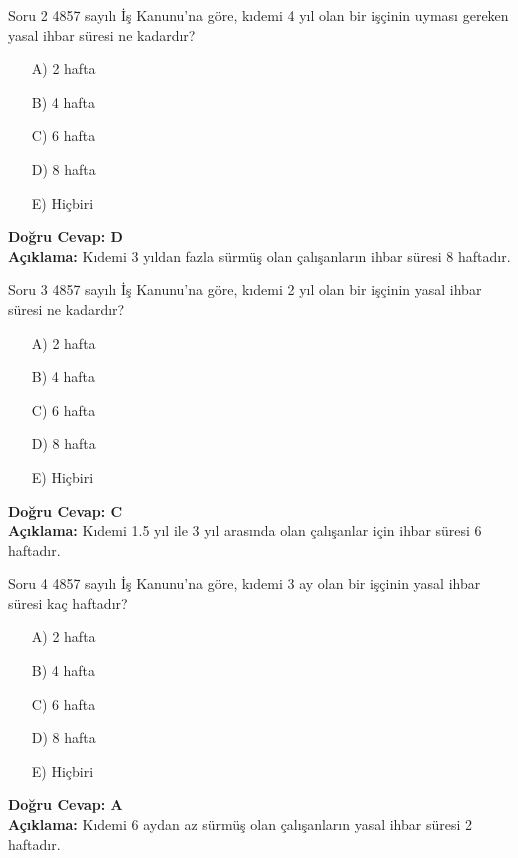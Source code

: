 \documentclass[12pt,a4paper]{article}
\begin{document}
\begin{testcard}{Soru 2}
    4857 sayılı İş Kanunu'na göre, kıdemi 4 yıl olan bir işçinin uyması gereken yasal ihbar süresi ne kadardır?
    \begin{itemize}
        \item[A)] 2 hafta
        \item[B)] 4 hafta
        \item[C)] 6 hafta
        \item[D)] 8 hafta
        \item[E)] Hiçbiri
    \end{itemize}
    \tcblower
    \textbf{Doğru Cevap: D} \\
    \textbf{Açıklama:} Kıdemi 3 yıldan fazla sürmüş olan çalışanların ihbar süresi 8 haftadır.
\end{testcard}

\begin{testcard}{Soru 3}
    4857 sayılı İş Kanunu'na göre, kıdemi 2 yıl olan bir işçinin yasal ihbar süresi ne kadardır?
    \begin{itemize}
        \item[A)] 2 hafta
        \item[B)] 4 hafta
        \item[C)] 6 hafta
        \item[D)] 8 hafta
        \item[E)] Hiçbiri
    \end{itemize}
    \tcblower
    \textbf{Doğru Cevap: C} \\
    \textbf{Açıklama:} Kıdemi 1.5 yıl ile 3 yıl arasında olan çalışanlar için ihbar süresi 6 haftadır.
\end{testcard}

\begin{testcard}{Soru 4}
    4857 sayılı İş Kanunu'na göre, kıdemi 3 ay olan bir işçinin yasal ihbar süresi kaç haftadır?
    \begin{itemize}
        \item[A)] 2 hafta
        \item[B)] 4 hafta
        \item[C)] 6 hafta
        \item[D)] 8 hafta
        \item[E)] Hiçbiri
    \end{itemize}
    \tcblower
    \textbf{Doğru Cevap: A} \\
    \textbf{Açıklama:} Kıdemi 6 aydan az sürmüş olan çalışanların yasal ihbar süresi 2 haftadır.
\end{testcard}
\end{document}

